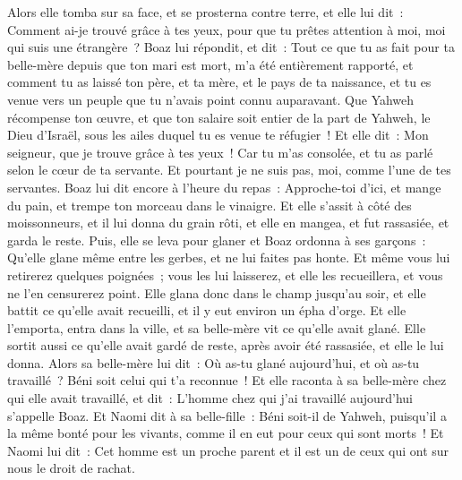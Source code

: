 \begin{multicols}{2}
Alors elle tomba sur sa face, et se prosterna contre terre, et elle lui dit~: Comment ai-je trouvé grâce à tes yeux, pour que tu prêtes attention à moi, moi qui suis une étrangère~?
Boaz lui répondit, et dit~: Tout ce que tu as fait pour ta belle-mère depuis que ton mari est mort, m'a été entièrement rapporté, et comment tu as laissé ton père, et ta mère, et le pays de ta naissance, et tu es venue vers un peuple que tu n'avais point connu auparavant.
Que Yahweh récompense ton œuvre, et que ton salaire soit entier de la part de Yahweh, le Dieu d'Israël, sous les ailes duquel tu es venue te réfugier~!
Et elle dit~: Mon seigneur, que je trouve grâce à tes yeux~! Car tu m'as consolée, et tu as parlé selon le cœur de ta servante. Et pourtant je ne suis pas, moi, comme l'une de tes servantes.
Boaz lui dit encore à l'heure du repas~: Approche-toi d'ici, et mange du pain, et trempe ton morceau dans le vinaigre. Et elle s'assit à côté des moissonneurs, et il lui donna du grain rôti, et elle en mangea, et fut rassasiée, et garda le reste.
Puis, elle se leva pour glaner et Boaz ordonna à ses garçons~: Qu'elle glane même entre les gerbes, et ne lui faites pas honte.
Et même vous lui retirerez quelques poignées~; vous les lui laisserez, et elle les recueillera, et vous ne l'en censurerez point.
Elle glana donc dans le champ jusqu'au soir, et elle battit ce qu'elle avait recueilli, et il y eut environ un épha d'orge.
Et elle l'emporta, entra dans la ville, et sa belle-mère vit ce qu'elle avait glané. Elle sortit aussi ce qu'elle avait gardé de reste, après avoir été rassasiée, et elle le lui donna.
Alors sa belle-mère lui dit~: Où as-tu glané aujourd'hui, et où as-tu travaillé~? Béni soit celui qui t'a reconnue~! Et elle raconta à sa belle-mère chez qui elle avait travaillé, et dit~: L'homme chez qui j'ai travaillé aujourd'hui s'appelle Boaz.
Et Naomi dit à sa belle-fille~: Béni soit-il de Yahweh, puisqu'il a la même bonté pour les vivants, comme il en eut pour ceux qui sont morts~! Et Naomi lui dit~: Cet homme est un proche parent et il est un de ceux qui ont sur nous le droit de rachat.

\end{multicols}
